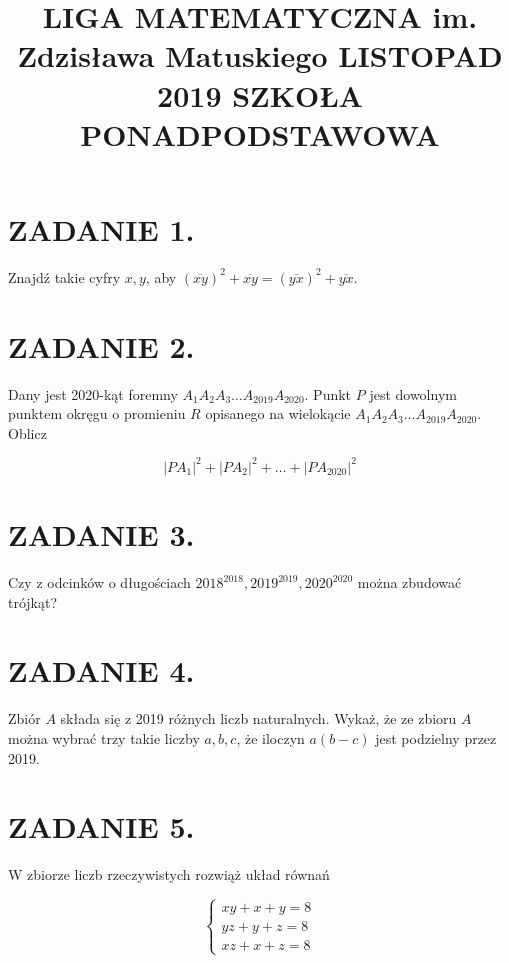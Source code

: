 \documentclass[10pt]{article}
\title{LIGA MATEMATYCZNA im. Zdzisława Matuskiego LISTOPAD 2019 SZKOŁA PONADPODSTAWOWA }
\author{}
\date{}
\begin{document}
\maketitle
\section*{ZADANIE 1.}
Znajdź takie cyfry \(x, y\), aby \((\overline{x y})^{2}+\overline{x y}=(\overline{y x})^{2}+\overline{y x}\).

\section*{ZADANIE 2.}
Dany jest 2020-kąt foremny \(A_{1} A_{2} A_{3} \ldots A_{2019} A_{2020}\). Punkt \(P\) jest dowolnym punktem okręgu o promieniu \(R\) opisanego na wielokącie \(A_{1} A_{2} A_{3} \ldots A_{2019} A_{2020}\). Oblicz

\[
\left|P A_{1}\right|^{2}+\left|P A_{2}\right|^{2}+\ldots+\left|P A_{2020}\right|^{2}
\]

\section*{ZADANIE 3.}
Czy z odcinków o długościach \(2018^{2018}, 2019^{2019}, 2020^{2020}\) można zbudować trójkąt?

\section*{ZADANIE 4.}
Zbiór \(A\) składa się z 2019 różnych liczb naturalnych. Wykaż, że ze zbioru \(A\) można wybrać trzy takie liczby \(a, b, c\), że iloczyn \(a(b-c)\) jest podzielny przez 2019.

\section*{ZADANIE 5.}
W zbiorze liczb rzeczywistych rozwiąż układ równań

\[
\left\{\begin{array}{l}
x y+x+y=8 \\
y z+y+z=8 \\
x z+x+z=8
\end{array}\right.
\]
\end{document}
